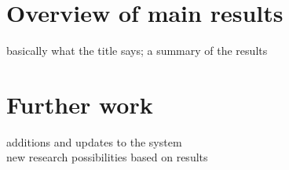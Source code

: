 \label{chap:chapter6}

\section{Overview of main results}
\label{sec:main_results}
basically what the title says; a summary of the results

\section{Further work}
\label{sec:further_work}
additions and updates to the system \\
new research possibilities based on results 

